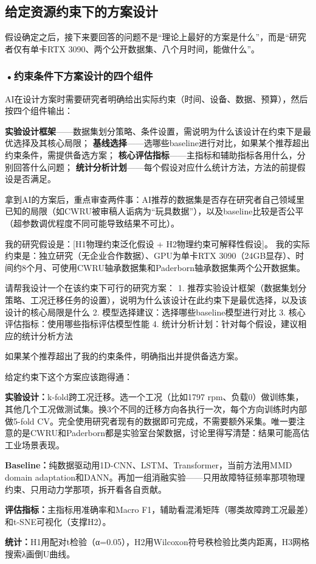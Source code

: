 \subsection{给定资源约束下的方案设计}

假设确定之后，接下来要回答的问题不是``理论上最好的方案是什么''，而是``研究者仅有单卡RTX 3090、两个公开数据集、八个月时间，能做什么''。

\subsubsection*{\textbf{•约束条件下方案设计的四个组件}}AI在设计方案时需要研究者明确给出实际约束（时间、设备、数据、预算），然后按四个组件输出：

\textbf{实验设计框架}——数据集划分策略、条件设置，需说明为什么该设计在约束下是最优选择及其核心局限；
\textbf{基线选择}——选哪些baseline进行对比，如果某个推荐超出约束条件，需提供备选方案；
\textbf{核心评估指标}——主指标和辅助指标各用什么，分别回答什么问题；
\textbf{统计分析计划}——每个假设对应什么统计方法，方法的前提假设是否满足。

拿到AI的方案后，重点审查两件事：AI推荐的数据集是否存在研究者自己领域里已知的局限（如CWRU被审稿人诟病为``玩具数据''），以及baseline比较是否公平（超参数调优程度不同可能导致结果不可比）。

\begin{userbox}
我的研究假设是：[H1物理约束泛化假设 + H2物理约束可解释性假设]。
我的实际约束是：独立研究（无企业合作数据）、GPU为单卡RTX 3090（24GB显存）、时间约8个月、可使用CWRU轴承数据集和Paderborn轴承数据集两个公开数据集。

请帮我设计一个在该约束下可行的研究方案：
1. 推荐实验设计框架（数据集划分策略、工况迁移任务的设置），说明为什么该设计在此约束下是最优选择，以及该设计的核心局限是什么
2. 模型选择建议：选择哪些baseline模型进行对比
3. 核心评估指标：使用哪些指标评估模型性能
4. 统计分析计划：针对每个假设，建议相应的统计分析方法

如果某个推荐超出了我的约束条件，明确指出并提供备选方案。
\end{userbox}

\begin{aibox}
给定约束下这个方案应该跑得通：

\textbf{实验设计：}k-fold跨工况迁移。选一个工况（比如1797 rpm、负载0）做训练集，其他几个工况做测试集。换3个不同的迁移方向各执行一次，每个方向训练时内部做5-fold CV。完全使用研究者现有的数据即可完成，不需要额外采集。唯一要注意的是CWRU和Paderborn都是实验室台架数据，讨论里得写清楚：结果可能高估工业场景表现。

\textbf{Baseline：}纯数据驱动用1D-CNN、LSTM、Transformer，当前方法用MMD domain adaptation和DANN。再加一组消融实验——只用故障特征频率那项物理约束、只用动力学那项，拆开看各自贡献。

\textbf{评估指标：}主指标用准确率和Macro F1，辅助看混淆矩阵（哪类故障跨工况最差）和t-SNE可视化（支撑H2）。

\textbf{统计：}H1用配对t检验（α=0.05），H2用Wilcoxon符号秩检验比类内距离，H3网格搜索λ画倒U曲线。
\end{aibox}

